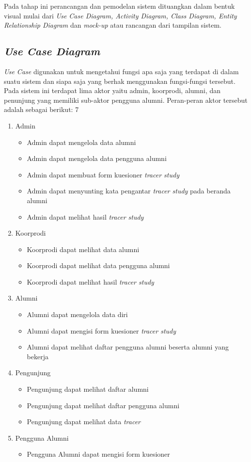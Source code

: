 Pada tahap ini perancangan dan pemodelan sistem dituangkan dalam bentuk visual mulai dari \textit{Use Case Diagram, Activity Diagram, Class Diagram, Entity Relationship Diagram} dan \textit{mock-up} atau rancangan dari tampilan sistem. 

\subsection{\emph{Use Case Diagram}}
\textit{Use Case} digunakan untuk mengetahui fungsi apa saja yang terdapat di dalam suatu sistem dan siapa saja yang berhak menggunakan fungsi-fungsi tersebut. Pada sistem ini terdapat lima aktor yaitu admin, koorprodi, alumni, dan penunjung yang memiliki sub-aktor pengguna alumni. Peran-peran aktor tersebut adalah sebagai berikut:
7
\begin{enumerate}
	\item Admin
	\begin{itemize}
		\item Admin dapat mengelola data alumni
		\item Admin dapat mengelola data pengguna alumni
		\item Admin dapat membuat form kuesioner \textit{tracer study}
		\item Admin dapat menyunting kata pengantar \textit{tracer study} pada beranda alumni 
		\item Admin dapat melihat hasil \textit{tracer study} 
	\end{itemize}
	\item Koorprodi 
	\begin{itemize}
		\item Koorprodi dapat melihat data alumni
		\item Koorprodi dapat melihat data pengguna alumni
		\item Koorprodi dapat melihat hasil \textit{tracer study}
	\end{itemize}
	\item Alumni
	\begin{itemize}
		\item Alumni dapat mengelola data diri
		\item Alumni dapat mengisi form kuesioner \textit{tracer study}
		\item Alumni dapat melihat daftar pengguna alumni beserta alumni yang bekerja
	\end{itemize}
	\item Pengunjung
	\begin{itemize}
		\item Pengunjung dapat melihat daftar alumni
		\item Pengunjung dapat melihat daftar pengguna alumni
		\item Pengunjung dapat melihat data \textit{tracer}
	\end{itemize}
	\item Pengguna Alumni
	\begin{itemize}
		\item Pengguna Alumni dapat mengisi form kuesioner
	\end{itemize}
\end{enumerate}

